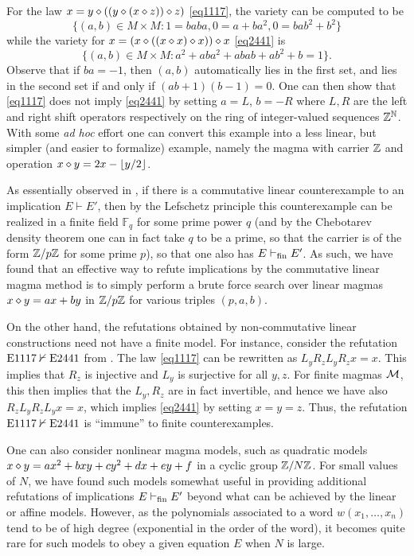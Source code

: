 \begin{example}\label{1117-ex} For the law $x = y \diamond ((y \diamond (x \diamond z)) \diamond z)$ \eqref{eq1117}, the variety  can be computed to be
$$ \{ (a,b) \in M \times M: 1 = baba, 0 = a+ba^2, 0 = bab^2 + b^2 \}$$
while the variety for $x = (x \diamond ((x \diamond x) \diamond x)) \diamond x$ \eqref{eq2441} is
$$ \{ (a,b) \in M \times M: a^2 + aba^2 + abab + ab^2 + b = 1 \}.$$
Observe that if $ba = -1$, then $(a,b)$ automatically lies in the first set, and lies in the second set if and only if $(ab+1)(b-1) = 0$.  One can then show that \eqref{eq1117} does not imply \eqref{eq2441} by setting $a = L$, $b = -R$ where $L, R$ are the left and right shift operators respectively on the ring of integer-valued sequences $\mathbb{Z}^{\mathbb{N}}$.  With some \emph{ad hoc} effort one can convert this example into a less linear, but simpler (and easier to formalize) example, namely the magma with carrier $\mathbb{Z}$ and operation $x \diamond y = 2x - \lfloor y/2 \rfloor$.
\end{example}

\begin{remark} As essentially observed in \cite{austin}, if there is a commutative linear counterexample to an implication $E \vdash E'$, then by the Lefschetz principle this counterexample can be realized in a finite field ${\mathbb F}_q$ for some prime power $q$ (and by the Chebotarev density theorem one can in fact take $q$ to be a prime, so that the carrier is of the form $\mathbb{Z}/p\mathbb{Z}$ for some prime $p$), so that one also has $E \vdash_{\mathrm{fin}} E'$.  As such, we have found that an effective way to refute implications by the commutative linear magma method is to simply perform a brute force search over linear magmas $x \diamond y = ax + by$ in $\mathbb{Z}/p\mathbb{Z}$ for various triples $(p,a,b)$.

On the other hand, the refutations obtained by non-commutative linear constructions need not have a finite model.  For instance, consider the refutation $\mathrm{E}1117 \nvdash \mathrm{E}2441$ from .  The law \eqref{eq1117} can be rewritten as $L_y R_z L_y R_z x = x$.  This implies that $R_z$ is injective and $L_y$ is surjective for all $y,z$.  For finite magmas ${\mathcal{M}}$, this then implies that the $L_y, R_z$ are in fact invertible, and hence we have also $R_z L_y R_z L_y x = x$, which implies \eqref{eq2441} by setting $x=y=z$.  Thus, the refutation $\mathrm{E}1117 \nvdash \mathrm{E}2441$ is ``immune'' to finite counterexamples.
\end{remark}

\begin{remark}  One can also consider nonlinear magma models, such as quadratic models $x \diamond y = ax^2 + bxy + cy^2 + dx + ey + f$ in a cyclic group $\mathbb{Z}/N\mathbb{Z}$.  For small values of $N$, we have found such models somewhat useful in providing additional refutations of implications $E \vdash_{\mathrm{fin}} E'$ beyond what can be achieved by the linear or affine models.  However, as the polynomials associated to a word $w(x_1,\dots,x_n)$ tend to be of high degree (exponential in the order of the word), it becomes quite rare for such models to obey a given equation $E$ when $N$ is large.
\end{remark}

